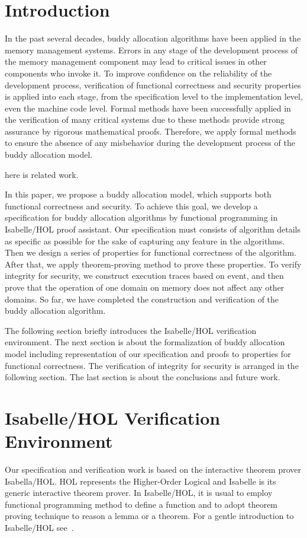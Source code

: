 \documentclass[runningheads]{llncs}
\begin{document}
\section{Introduction}
In the past several decades, buddy allocation algorithms have been applied in the memory management systems. Errors in any stage of the development process of the memory management component may lead to critical issues in other components who invoke it. To improve confidence on the reliability of the development process, verification of functional correctness and security properties is applied into each stage, from the specification level to the implementation level, even the machine code level. Formal methods have been successfully applied in the verification of many critical systems due to these methods provide strong assurance by rigorous mathematical proofs. Therefore, we apply formal methods to ensure the absence of any misbehavior during the development process of the buddy allocation model.

here is related work.

In this paper, we propose a buddy allocation model, which supports both functional correctness and security. To achieve this goal, we develop a specification for buddy allocation algorithms by functional programming in Isabelle/HOL proof assistant. Our specification must consists of algorithm details as specific as possible for the sake of capturing any feature in the algorithms. Then we design a series of properties for functional correctness of the algorithm. After that, we apply theorem-proving method to prove these properties. To verify integrity for security, we construct execution traces based on event, and then prove that the operation of one domain on memory does not affect any other domains. So far, we have completed the construction and verification of the buddy allocation algorithm.

The following section briefly introduces the Isabelle/HOL verification environment. The next section is about the formalization of buddy allocation model including representation of our specification and proofs to properties for functional correctness. The verification of integrity for security is arranged in the following section. The last section is about the conclusions and future work.


\section{Isabelle/HOL Verification Environment}
Our specification and verification work is based on the interactive theorem prover Isabella/HOL. HOL represents the Higher-Order Logical and Isabelle is its generic interactive theorem prover. In Isabelle/HOL, it is usual to employ functional programming method to define a function and to adopt theorem proving technique to reason a lemma or a theorem. For a gentle introduction to Isabelle/HOL see~\cite{reg_Isabelle/HOL}. 
\end{document}
